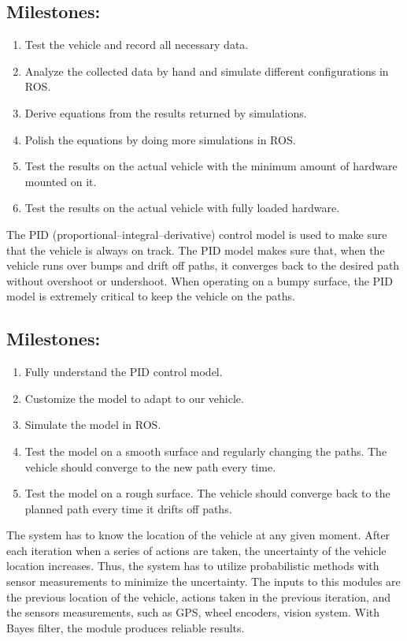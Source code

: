 \documentclass[compsoc,draftclsnofoot,onecolumn,10pt]{IEEEtran}
\begin{document}
\subsection{Milestones:}
\begin{enumerate}
	\item Test the vehicle and record all necessary data.
	\item Analyze the collected data by hand and simulate different configurations in ROS.
	\item Derive equations from the results returned by simulations.
	\item Polish the equations by doing more simulations in ROS.
	\item Test the results on the actual vehicle with the minimum amount of hardware mounted on it.
	\item Test the results on the actual vehicle with fully loaded hardware.
\end{enumerate}
The PID (proportional–integral–derivative) control model is used to make sure that the vehicle is always on track. The PID model makes sure that, when the vehicle runs over bumps and drift off paths, it converges back to the desired path without overshoot or undershoot. When operating on a bumpy surface, the PID model is extremely critical to keep the vehicle on the paths.\par
\subsection{Milestones:}
\begin{enumerate}
	\item Fully understand the PID control model.
	\item Customize the model to adapt to our vehicle.
	\item Simulate the model in ROS.
	\item Test the model on a smooth surface and regularly changing the paths. The vehicle should converge to the new path every time.
	\item Test the model on a rough surface. The vehicle should converge back to the planned path every time it drifts off paths.
\end{enumerate}

The system has to know the location of the vehicle at any given moment. After each iteration when a series of actions are taken, the uncertainty of the vehicle location increases. Thus, the system has to utilize probabilistic methods with sensor measurements to minimize the uncertainty. The inputs to this modules are the previous location of the vehicle, actions taken in the previous iteration, and the sensors measurements, such as GPS, wheel encoders, vision system. With Bayes filter, the module produces reliable results.\par
\end{document}
